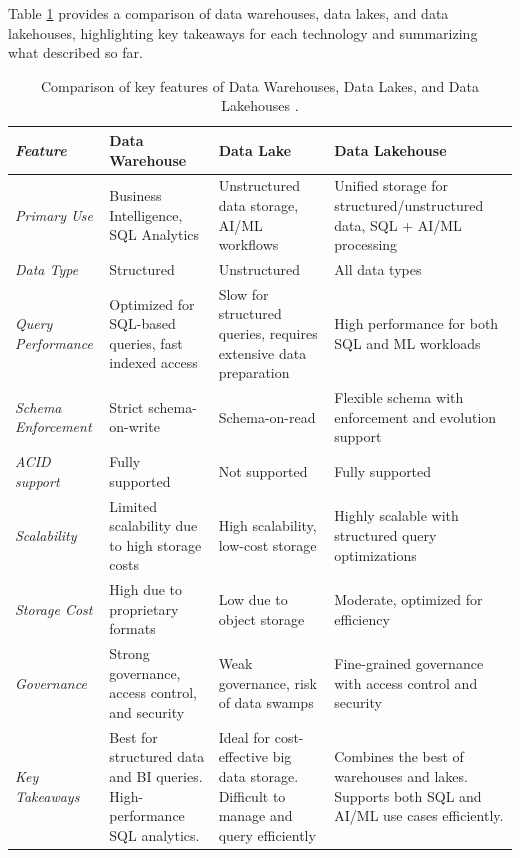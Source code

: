 Table \ref{tab:DBMS_comparison} provides a comparison of data warehouses, data lakes, and data lakehouses, highlighting key takeaways for each technology and summarizing what described so far.

\begin{table}[h]
    \centering
    \caption[Comparison of data architectures]{Comparison of key features of Data Warehouses, Data Lakes, and Data Lakehouses \cite{inmonFiveStepsSuccessful}.}
    \label{tab:DBMS_comparison}
    \begin{tabular}{|p{2.2cm}|p{3cm}|p{2.9cm}|p{3cm}|}
        \hline
        \textit{\textbf{Feature}} & \textbf{Data Warehouse} & \textbf{Data Lake} & \textbf{Data Lakehouse} \\
        \hline
        \textit{Primary Use} & Business Intelligence, SQL Analytics & Unstructured data storage, AI/ML workflows & Unified storage for structured/unstructured data, SQL + AI/ML processing \\
        \hline
        \textit{Data Type} & Structured & Unstructured & All data types \\
        \hline
        \textit{Query Performance} & Optimized for SQL-based queries, fast indexed access & Slow for structured queries, requires extensive data preparation & High performance for both SQL and ML workloads \\
        \hline
        \textit{Schema Enforcement} & Strict schema-on-write & Schema-on-read & Flexible schema with enforcement and evolution support \\
        \hline
        \textit{\gls{ACID} support} & Fully supported & Not supported & Fully supported \\
        \hline
        \textit{Scalability} & Limited scalability due to high storage costs & High scalability, low-cost storage & Highly scalable with structured query optimizations \\
        \hline
        \textit{Storage Cost} & High due to proprietary formats & Low due to object storage & Moderate, optimized for efficiency \\
        \hline
        \textit{Governance} & Strong governance, access control, and security & Weak governance, risk of data swamps & Fine-grained governance with access control and security \\
        \hline
        \textit{Key Takeaways} & Best for structured data and BI queries. High-performance SQL analytics. & Ideal for cost-effective big data storage. Difficult to manage and query efficiently & Combines the best of warehouses and lakes. Supports both SQL and AI/ML use cases efficiently. \\
        \hline
    \end{tabular}
\end{table}



